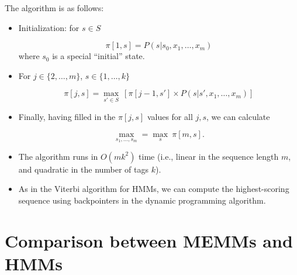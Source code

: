 The algorithm is as follows:

\begin{itemize}

\item  Initialization: for $s \in  S$

\begin{displaymath}
  \pi[1,s] = P (s | s_0,x_1,\dots,x_m)
\end{displaymath}
where $s_0$ is a special ``initial'' state.

\item For $j \in \{2,\dots,m\}$, $s \in  \{1,\dots,k\}$

\begin{displaymath}
  \pi[j,s] =  \max_{s' \in S} \ [\pi[j-1,s'] \times P (s | s',x_1,\dots,x_m)]
\end{displaymath}


\item  Finally, having filled in the $\pi[j,s]$ values for all $j, s$, we can calculate

\begin{displaymath}
  \max_{s_1,\dots,s_m} = \max_{s} \ \pi[m,s].
\end{displaymath}


\item The algorithm runs in $O(mk^2)$ time (i.e., linear in the sequence length $m$,
and quadratic in the number of tags $k$).


\item As in the Viterbi algorithm for HMMs, we can compute the highest-scoring sequence using backpointers in the dynamic programming algorithm.

\end{itemize}




\section{Comparison between MEMMs and HMMs}

